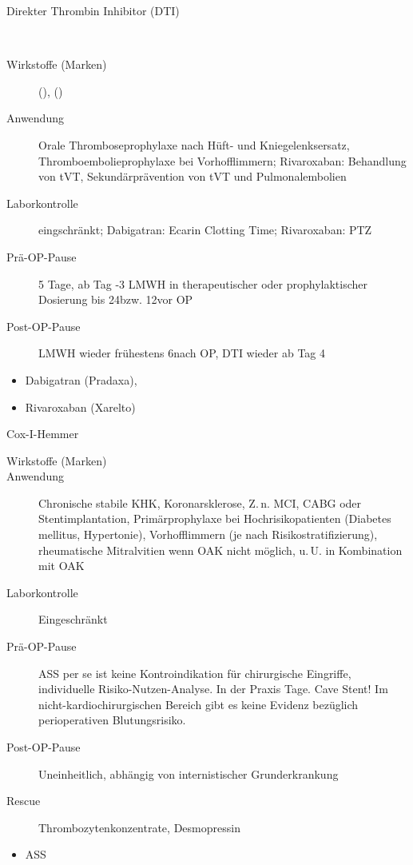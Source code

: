\TextSlide
{Direkter Thrombin Inhibitor (DTI)}
{~

\begin{description}
  \item[Wirkstoffe (Marken)] 
  (), 
  ()
  \item[Anwendung] Orale Thromboseprophylaxe
  nach Hüft- und Kniegelenksersatz,
  Thromboembolieprophylaxe bei Vorhofflimmern;
  Rivaroxaban: Behandlung von tVT, Sekundärprävention von
  tVT und Pulmonalembolien
  \item[Laborkontrolle] eingschränkt; Dabigatran: Ecarin
  Clotting Time; Rivaroxaban: PTZ
  \item[Prä-OP-Pause] 5 Tage, ab Tag -3 LMWH in
  therapeutischer oder prophylaktischer Dosierung bis
  24\Hour* bzw. 12\Hour* vor OP
  \item[Post-OP-Pause] LMWH wieder frühestens
  6\Hour* nach OP, DTI wieder ab Tag 4
\end{description}
}
{
\begin{itemize}
  \item Dabigatran (Pradaxa{\texttrademark}), 
  \item Rivaroxaban (Xarelto{\texttrademark}) 
\end{itemize}
}
{}
{}
{}



\TextSlide
{Cox-I-Hemmer}
{
\begin{description}
  \item[Wirkstoffe (Marken)] 
  \item[Anwendung] Chronische stabile KHK, Koronarsklerose,
  Z.\,n. MCI, CABG oder Stentimplantation, Primärprophylaxe
  bei Hochrisikopatienten (Diabetes mellitus, Hypertonie),
  Vorhofflimmern (je nach Risikostratifizierung),
  rheumatische Mitralvitien wenn OAK nicht möglich, u.\,U.
  in Kombination mit OAK
  \item[Laborkontrolle] Eingeschränkt
  \item[Prä-OP-Pause] ASS per se ist keine
  Kontroindikation für chirurgische Eingriffe,
  individuelle Risiko-Nutzen-Analyse. In der
  Praxis  Tage. Cave Stent!
  Im nicht-kardiochirurgischen Bereich gibt es keine Evidenz
  bezüglich perioperativen Blutungsrisiko.
  \item[Post-OP-Pause] Uneinheitlich, abhängig von
  internistischer Grunderkrankung
  \item[Rescue] Thrombozytenkonzentrate, Desmopressin
\end{description}
}
{
\begin{itemize}
  \item ASS
\end{itemize}
}
{}
{}
{}



